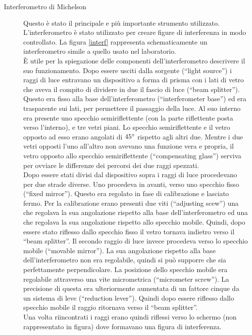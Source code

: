 \documentclass[a4paper,11pt]{article}
\newcommand{\virgolette}[1]{``#1''}
\begin{document}
\begin{description}
	
	\item[Interferometro di Michelson] Questo è stato il principale e più importante strumento utilizzato. L'interferometro è stato utilizzato per creare figure di interferenza in modo controllato. La figura \ref{interf} rappresenta schematicamente un interferometro simile a quello usato nel laboratorio.\\
	È utile per la spiegazione delle componenti dell'interferometro descrivere il suo funzionamento. Dopo essere usciti dalla sorgente (\virgolette{light source}) i raggi di luce entravano un dispositivo a forma di prisma con i lati di vetro che aveva il compito di dividere in due il fascio di luce (\virgolette{beam splitter}).
	Questo era fisso alla base dell'interferometro (\virgolette{interferometer base}) ed era trasparente sui lati, per permettere il passaggio della luce. Al suo interno era presente uno specchio semiriflettente (con la parte riflettente posta verso l'interno), e tre vetri piani. Lo specchio semiriflettente e il vetro opposto ad esso erano angolati di $ 45\degree $ rispetto agli altri due. Mentre i due vetri opposti l'uno all'altro non avevano una funzione vera e propria, il vetro opposto allo specchio semiriflettente (\virgolette{compensating glass}) serviva per ovviare le differenze dei percorsi dei due raggi spezzati.\\
	Dopo essere stati divisi dal dispositivo sopra i raggi di luce procedevano per due strade diverse. Uno procedeva in avanti, verso uno specchio fisso (\virgolette{fixed mirror}). Questo era regolato in fase di calibrazione e lasciato fermo. Per la calibrazione erano presenti due viti (\virgolette{adjusting scew}) una che regolava la sua angolazione rispetto alla base dell'interferometro ed una che regolava la sua angolazione rispetto allo specchio mobile. Quindi, dopo essere stato riflesso dallo specchio fisso il vetro tornava indietro verso il \virgolette{beam splitter}. Il secondo raggio di luce invece procedeva verso lo specchio mobile (\virgolette{movable mirror}). La sua angolazione rispetto alla base dell'interferometro non era regolabile, quindi si può supporre che sia perfettamente perpendicolare. La posizione dello specchio mobile era regolabile attraverso una vite micrometrica (\virgolette{micrometer screw}). La precisione di questa era ulteriormente aumentata di un fattore cinque da un sistema di leve (\virgolette{reduction lever}). Quindi dopo essere riflesso dallo specchio mobile il raggio ritornava verso il \virgolette{beam splitter}.\\
	Una volta riincontrati i raggi erano quindi riflessi verso lo schermo (non rappresentato in figura) dove formavano una figura di interferenza.

\end{description}
\end{document}
